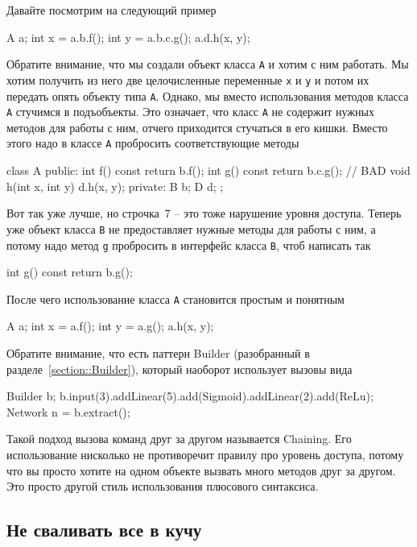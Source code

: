 Давайте посмотрим на следующий пример
\begin{cppcode}
A a;
int x = a.b.f();
int y = a.b.c.g();
a.d.h(x, y);
\end{cppcode}
Обратите внимание, что мы создали объект класса \verb"A" и хотим с ним работать.
Мы хотим получить из него две целочисленные переменные \verb"x" и \verb"y" и потом их передать опять объекту типа \verb"A".
Однако, мы вместо использования методов класса \verb"A" стучимся в подъобъекты.
Это означает, что класс \verb"A" не содержит нужных методов для работы с ним, отчего приходится стучаться в его кишки.
Вместо этого надо в классе \verb"A" пробросить соответствующие методы
\begin{cppcode}
class A {
public:
  int f() const {
    return b.f();
  }
  int g() const {
    return b.c.g(); // BAD
  }
  void h(int x, int y) {
    d.h(x, y);
  }
private:
  B b;
  D d;
};
\end{cppcode}
Вот так уже лучше, но строчка~7 -- это тоже нарушение уровня доступа.
Теперь уже объект класса \verb"B" не предоставляет нужные методы для работы с ним, а потому надо метод \verb"g" пробросить в интерфейс класса \verb"B", чтоб написать так
\begin{cppcode}
int g() const {
  return b.g();
}
\end{cppcode}
После чего использование класса \verb"A" становится простым и понятным
\begin{cppcode}
A a;
int x = a.f();
int y = a.g();
a.h(x, y);
\end{cppcode}
Обратите внимание, что есть паттерн Builder (разобранный в разделе~\ref{section::Builder}), который наоборот использует вызовы вида
\begin{cppcode}
Builder b;
b.input(3).addLinear(5).add(Sigmoid).addLinear(2).add(ReLu);
Network n = b.extract();
\end{cppcode}
Такой подход вызова команд друг за другом называется Chaining.
Его использование нисколько не противоречит правилу про уровень доступа, потому что вы просто хотите на одном объекте вызвать много методов друг за другом.
Это просто другой стиль использования плюсового синтаксиса.

\subsection{Не сваливать все в кучу}
\label{section::SeparateStuff}

